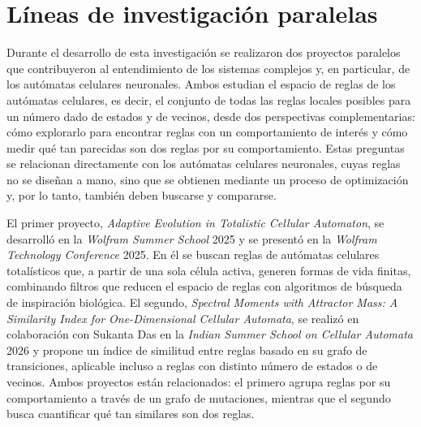 \chapter{Líneas de investigación paralelas}

Durante el desarrollo de esta investigación se realizaron dos proyectos paralelos que contribuyeron al entendimiento de los sistemas complejos y, en particular, de los autómatas celulares neuronales. Ambos estudian el espacio de reglas de los autómatas celulares, es decir, el conjunto de todas las reglas locales posibles para un número dado de estados y de vecinos, desde dos perspectivas complementarias: cómo explorarlo para encontrar reglas con un comportamiento de interés y cómo medir qué tan parecidas son dos reglas por su comportamiento. Estas preguntas se relacionan directamente con los autómatas celulares neuronales, cuyas reglas no se diseñan a mano, sino que se obtienen mediante un proceso de optimización y, por lo tanto, también deben buscarse y compararse.

El primer proyecto, \textit{Adaptive Evolution in Totalistic Cellular Automaton}, se desarrolló en la \textit{Wolfram Summer School} 2025 y se presentó en la \textit{Wolfram Technology Conference} 2025. En él se buscan reglas de autómatas celulares totalísticos que, a partir de una sola célula activa, generen formas de vida finitas, combinando filtros que reducen el espacio de reglas con algoritmos de búsqueda de inspiración biológica. El segundo, \textit{Spectral Moments with Attractor Mass: A Similarity Index for One-Dimensional Cellular Automata}, se realizó en colaboración con Sukanta Das en la \textit{Indian Summer School on Cellular Automata} 2026 y propone un índice de similitud entre reglas basado en su grafo de transiciones, aplicable incluso a reglas con distinto número de estados o de vecinos. Ambos proyectos están relacionados: el primero agrupa reglas por su comportamiento a través de un grafo de mutaciones, mientras que el segundo busca cuantificar qué tan similares son dos reglas.
